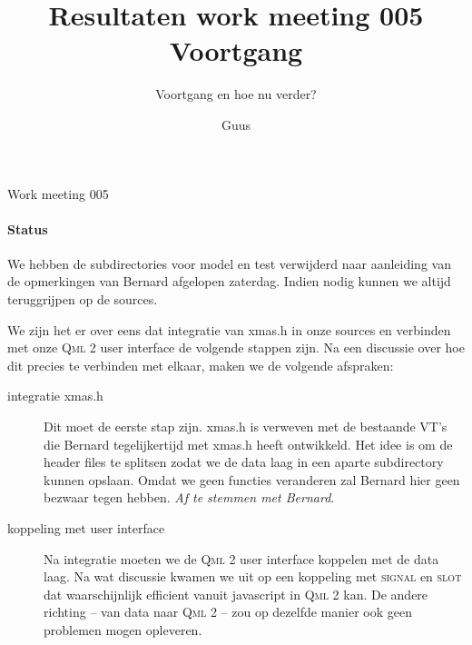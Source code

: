 \documentclass[a4paper,final]{article}
\title{Resultaten work meeting 005 Voortgang }
\author{Guus}
\begin{document}

\newcommand{\Noc}{\textsc{NoC}\xspace}
\newcommand{\w}[1]{\textsc{#1}\xspace}
\newcommand{\qml}{\textsc{Qml}\xspace}
\newcommand{\qt}{\textsc{Qt}\xspace}
\newcommand{\qtquick}{\textsc{QtQuick}\xspace}
\newcommand{\tv}{\textsc{TeamViewer}\xspace}
\newcommand{\cpp}{\textsc{C++}\xspace}
\newcommand{\fltk}{\textsc{Fltk}\xspace}
\newcommand{\ou}{\textsc{OU}\xspace}
\newcommand{\signal}{\textsc{signal}\xspace}
\newcommand{\slot}{\textsc{slot}\xspace}

\begin{Minutes}{Work meeting 005}
\subtitle{Voortgang en hoe nu verder?}

\maketitle%


\paragraph{Status} We hebben de subdirectories voor model en test verwijderd
naar aanleiding van de opmerkingen van Bernard afgelopen zaterdag. Indien nodig kunnen
we altijd teruggrijpen op de sources.

We zijn het er over eens dat integratie van xmas.h in onze sources en verbinden met
onze \qml2 user interface de volgende stappen zijn. Na een discussie over hoe dit
precies te verbinden met elkaar, maken we de volgende afspraken:

\begin{description}

	\item[integratie xmas.h] Dit moet de eerste stap zijn. xmas.h is verweven met 
	de bestaande VT's die Bernard tegelijkertijd met xmas.h heeft ontwikkeld.
	Het idee is om de header files te splitsen zodat we de data laag in een 
	aparte subdirectory kunnen opslaan. Omdat we geen functies veranderen zal
	Bernard hier geen bezwaar tegen hebben. \textit{Af te stemmen met Bernard}.
	
	\item[koppeling met user interface] Na integratie moeten we de \qml2 user
	interface koppelen met de data laag. Na wat discussie kwamen we uit op
	een koppeling met \w{signal} en \w{slot} dat waarschijnlijk efficient 
	vanuit javascript in \qml2 kan. De andere richting -- van data naar \qml2 --
	zou op dezelfde manier ook geen problemen mogen opleveren.
	

\end{description}
\end{Minutes}
\end{document}
